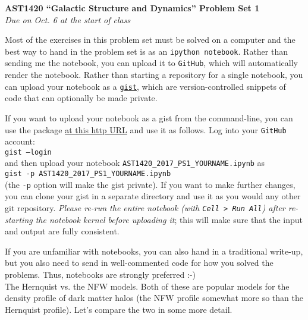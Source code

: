 \documentclass[12pt]{article}
\begin{document}
\begin{center}
{\bf \LARGE AST1420 ``Galactic Structure and Dynamics'' Problem Set 1}\\[7pt]
\emph{Due on Oct. 6 at the start of class}\\[7pt]
\end{center}

Most of the exercises in this problem set must be solved on a computer
and the best way to hand in the problem set is as an \texttt{ipython
  notebook}. Rather than sending me the notebook, you can upload it to
\texttt{GitHub}, which will automatically render the notebook. Rather
than starting a repository for a single notebook, you can upload your
notebook as a \texttt{\href{https://gist.github.com/}{gist}}, which
are version-controlled snippets of code that can optionally be made
private.

If you want to upload your notebook as a gist from the command-line,
you can use the package \href{http://github.com/defunkt/gist}{at this
  http URL} and use it as follows. Log into your \texttt{GitHub}
account:\\

\texttt{gist --login}\\

and then upload your notebook
\texttt{AST1420\_2017\_PS1\_YOURNAME.ipynb} as\\

\texttt{gist -p AST1420\_2017\_PS1\_YOURNAME.ipynb}\\

(the \texttt{-p} option will make the gist private). If you want to
make further changes, you can clone your gist in a separate directory
and use it as you would any other git repository. \emph{Please re-run
  the entire notebook (with \texttt{Cell > Run All}) after re-starting
  the notebook kernel before uploading it}; this will make sure that
the input and output are fully consistent.

If you are unfamiliar with notebooks, you can also hand in a
traditional write-up, but you also need to send in well-commented code
for how you solved the problems. Thus, notebooks are strongly preferred :-)\\

 The Hernquist vs. the NFW models. Both of
these are popular models for the density profile of dark matter halos
(the NFW profile somewhat more so than the Hernquist profile). Let's
compare the two in some more detail.\\
\end{document}
